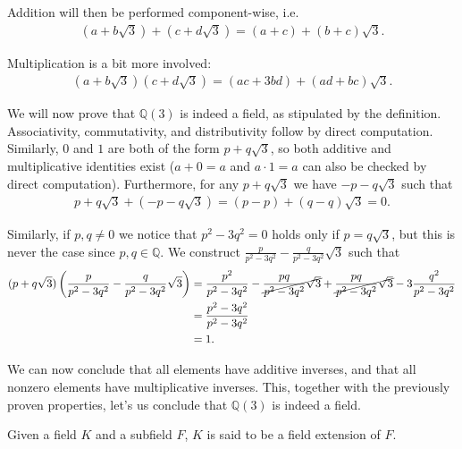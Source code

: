 \begin{exmp}
  Addition will then be performed component-wise, i.e. 
  \begin{align*}
  (a + b \sqrt 3) + (c + d \sqrt 3) = (a + c)  + (b + c) \sqrt 3.
  \end{align*}

  Multiplication is a bit more involved:
  \begin{align*}
    (a + b \sqrt 3)(c + d \sqrt 3) = (ac + 3bd) + (ad + bc) \sqrt 3.
  \end{align*}

  We will now prove that $ \mathbb{Q} (3)$ is indeed a field, as stipulated by the definition. Associativity,  commutativity, and distributivity follow by direct computation. Similarly, $0$ and $1$ are both of the form $p + q \sqrt 3$, so both additive and multiplicative identities exist ($a + 0 = a$ and $a \cdot 1 = a$ can also be checked by direct computation). Furthermore, for any $p + q \sqrt 3$ we have $-p -q \sqrt 3$ such that 
  \begin{align*}
    p + q\sqrt 3 + (- p - q\sqrt 3) = (p - p) + (q - q) \sqrt 3 = 0.
  \end{align*}

  Similarly, if $p, q \neq 0$ we notice that $p ^2 - 3 q ^2 = 0$ holds only if $p = q \sqrt 3$, but this is never the case since $p, q \in \mathbb{Q}$. We construct $\frac p {p ^2 - 3 q ^2 } - \frac q {p ^2 - 3 q ^2 } \sqrt 3$ such that
  \begin{align*}
    (p + q \sqrt 3)\left(\frac p {p ^2 - 3 q ^2 } - \frac q {p ^2 - 3 q ^2 } \sqrt 3\right)
    &= \frac {p ^2}  {p ^2 - 3 q ^2 } - \cancel{\frac {pq} {p ^2 - 3 q ^2 } \sqrt 3}
    + \cancel{\frac {pq}  {p ^2 - 3 q ^2 } \sqrt 3} - 3\frac {q ^2 } {p ^2 - 3 q ^2 }
    \\&= \frac{p ^2 - 3 q ^2 }{p ^2 - 3 q ^2 }
    \\&= 1.
  \end{align*}

  We can now conclude that all elements have additive inverses, and that all nonzero elements have multiplicative inverses. This, together with the previously proven properties, let's us conclude that $\mathbb{Q} (3)$ is indeed a field.
\end{exmp}

\begin{defn}
 Given a field $K$ and a subfield $F$, $K$ is said to be a field extension of $F$.
\end{defn}


